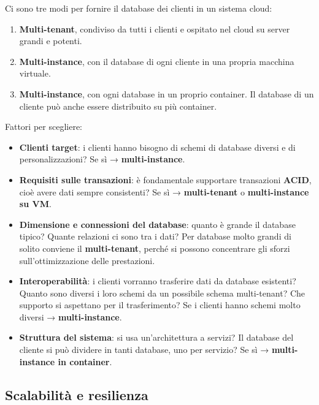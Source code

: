Ci sono tre modi per fornire il database dei clienti in un sistema
cloud:

\begin{enumerate}
\def\labelenumi{\arabic{enumi}.}
\tightlist
\item
  \textbf{Multi-tenant}, condiviso da tutti i clienti e ospitato nel
  cloud su server grandi e potenti.
\item
  \textbf{Multi-instance}, con il database di ogni cliente in una
  propria macchina virtuale.
\item
  \textbf{Multi-instance}, con ogni database in un proprio container. Il
  database di un cliente può anche essere distribuito su più container.
\end{enumerate}

Fattori per scegliere:

\begin{itemize}
\tightlist
\item
  \textbf{Clienti target}: i clienti hanno bisogno di schemi di database
  diversi e di personalizzazioni? Se sì → \textbf{multi-instance}.
\item
  \textbf{Requisiti sulle transazioni}: è fondamentale supportare
  transazioni \textbf{ACID}, cioè avere dati sempre consistenti? Se sì →
  \textbf{multi-tenant} o \textbf{multi-instance su VM}.
\item
  \textbf{Dimensione e connessioni del database}: quanto è grande il
  database tipico? Quante relazioni ci sono tra i dati? Per database
  molto grandi di solito conviene il \textbf{multi-tenant}, perché si
  possono concentrare gli sforzi sull'ottimizzazione delle prestazioni.
\item
  \textbf{Interoperabilità}: i clienti vorranno trasferire dati da
  database esistenti? Quanto sono diversi i loro schemi da un possibile
  schema multi-tenant? Che supporto si aspettano per il trasferimento?
  Se i clienti hanno schemi molto diversi → \textbf{multi-instance}.
\item
  \textbf{Struttura del sistema}: si usa un'architettura a servizi? Il
  database del cliente si può dividere in tanti database, uno per
  servizio? Se sì → \textbf{multi-instance in container}.
\end{itemize}

\subsection{Scalabilità e resilienza}\label{scalabilituxe0-e-resilienza}

